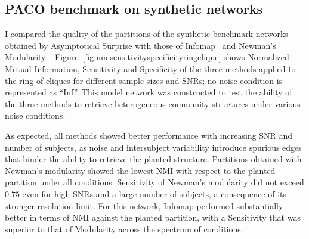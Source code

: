 \subsection{PACO benchmark on synthetic networks}
I compared the quality of the partitions of the synthetic benchmark networks obtained by Asymptotical Surprise with those of Infomap~\cite{rosvall2008} and Newman's Modularity~\cite{newman2006,blondel2008}. Figure~\ref{fig:nmisensitivityspecificityringclique} shows Normalized Mutual Information, Sensitivity and Specificity of the three methods applied to the ring of cliques for different sample sizes and SNRs; no-noise condition is represented as ``Inf''.
This model network was constructed to test the ability of the three methods to retrieve heterogeneous community structures under various noise conditions.

As expected, all methods showed better performance with increasing SNR and number of subjects, as noise and intersubject variability introduce spurious edges that hinder the ability to retrieve the planted structure.
Partitions obtained with Newman's modularity showed the lowest NMI with respect to the planted partition under all conditions.
Sensitivity of Newman's modularity did not exceed $0.75$ even for high SNRs and a large number of subjects, a consequence of its stronger resolution limit.
For this network, Infomap performed substantially better in terms of NMI against the planted partition, with a Sensitivity that was superior to that of Modularity across the spectrum of conditions.

